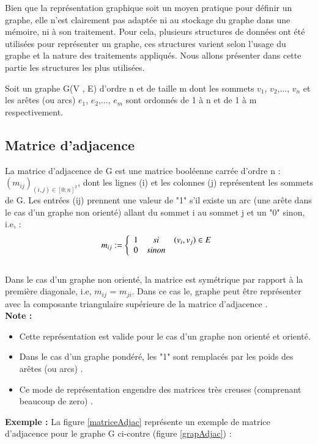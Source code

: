 Bien que la représentation graphique soit un moyen pratique pour définir un graphe, elle n'est clairement pas adaptée ni au stockage du graphe dans une mémoire, ni à son traitement. Pour cela, plusieurs structures de données ont été utilisées pour représenter un graphe, ces structures varient selon l’usage du graphe et la nature des traitements appliqués. Nous allons présenter dans cette partie les structures les plus utilisées.

Soit un graphe G(V , E) d'ordre n et de taille m dont les sommets $\textit{v}_{1}$, $\textit{v}_{2}$,..., $\textit{v}_{n}$ et les arêtes (ou arcs) $\textit{e}_{1}$, $\textit{e}_{2}$,..., $\textit{e}_{m}$ sont ordonnés de 1 à n et de 1 à m respectivement.
		
		

		
			\subsection{Matrice d'adjacence}
			
				La matrice d’adjacence de G est une matrice booléenne 					carrée d’ordre n : ${({m}_{ij})}_{(i,j) \in {[0;n]}^{2}}$,  dont les 					lignes (i) et les colonnes (j)  représentent les sommets de G. Les entrées (ij) prennent une valeur de "1" s’il existe un 				arc (une arête dans le cas d'un graphe non orienté) allant du 			sommet i au sommet j et un "0" sinon, i.e, \citep{lehman2010mathematics} \citep{mathieu} \citep{IUTLyonInformatique} :
			\[{m}_{ij} :=
			\left\{
			\begin{array}{r c l}
			1 & si & (\textit{v}_{i} , \textit{v}_{j}) \in E \\
			0 & sinon
			\end{array}
			\right.
			\]
			\\
			Dans le cas d’un graphe non orienté, la matrice est 						symétrique par rapport à la première diagonale, i.e, ${m}_{ij}$ = ${m}_{ji}$. Dans ce cas le, 						graphe peut être représenter avec  la composante 							triangulaire supérieure de la matrice d'adjacence \citep{muller}.\\
			\textbf{Note :} \begin{itemize} 
			\item Cette représentation est valide pour le cas 					d'un graphe non orienté et orienté.
			\item Dans le cas d'un graphe pondéré, les "1" sont remplacés par les poids des arêtes (ou arcs) \citep{lopez2003cours}.
			\item Ce mode de représentation engendre des matrices très creuses (comprenant beaucoup de zero) \citep{hennecart2012elements}. 
			\end{itemize}
			\textbf{Exemple :} La figure \ref{matriceAdjac} représente 					un exemple de matrice d'adjacence pour le graphe G ci-contre 			(figure \ref{grapAdjac}) :
			
